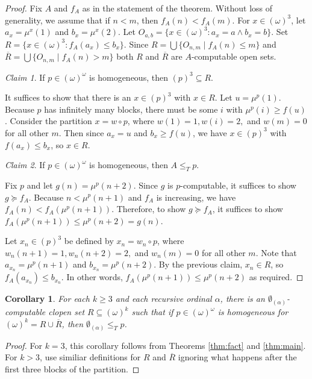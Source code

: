 \documentclass{amsart}
\newtheorem{cor}[thm]{Corollary}
\theoremstyle{definition}
\theoremstyle{remark}
\newtheorem*{claim}{Claim}
\begin{document}
\begin{proof}
Fix $A$ and $f_A$ as in the statement of the theorem. Without loss of generality, we assume that if $n < m$, then $f_A(n) < f_A(m)$. 
For $x \in (\omega)^3$, let $a_x = \mu^x(1)$ and $b_x = \mu^x(2)$. 
Let $O_{a,b} =  
\{ x \in (\omega)^3 : a_x = a \wedge b_x = b \}$. Set   
$R = \{ x \in (\omega)^3 : f_A(a_x) \leq b_x \}$. Since  $R = \bigcup \{ O_{n,m} \mid f_A(n) \leq m \}$ and $\overline{R} = \bigcup \{ O_{n,m} \mid f_A(n) > m \}$
both $R$ and $\overline{R}$ are $A$-computable open sets. 

\begin{claim}
If $p \in (\omega)^{\omega}$ is homogeneous, then $(p)^3 \subseteq R$. 
\end{claim}

It suffices to show that there is an $x \in (p)^3$ with $x \in R$.  Let $u = \mu^p(1)$. 
Because $p$ has infinitely many blocks, there must be some $i$ with $\mu^p(i) \geq f(u)$. Consider the partition $x = w \circ p$, where $w(1) = 1, w(i) =2,$ and $w(m) = 0$ for all other $m$.  Then since $a_x =
u$ and $b_x \geq f(u)$, we have $x \in (p)^3$ with $f(a_x) \leq b_x$, so $x \in R$.

\begin{claim}
If $p \in (\omega)^{\omega}$ is homogeneous, then $A \leq_T p$.
\end{claim}

Fix $p$ and let $g(n) = \mu^p(n+2)$. Since $g$ is $p$-computable, it suffices to show $g \succeq f_A$. Because  
$n < \mu^p(n+1)$ and $f_A$ is increasing, we have $f_A(n) < f_A(\mu^p(n+1))$. Therefore, to show $g \succeq f_A$, it suffices 
to show $f_A(\mu^p(n+1)) \leq \mu^p(n+2) = g(n)$. 

Let $x_n \in (p)^3$ be defined by $x_n = w_n\circ p$, where
$w_n(n+1) = 1, w_n(n+2) = 2,$ and $w_n(m) = 0$ for all other $m$.
Note that $a_{x_n} = \mu^p(n+1)$ and $b_{x_n} =
\mu^p(n+2)$.  By the previous claim, $x_n \in R$, so
$f_A(a_{x_n}) \leq b_{x_n}$. In other words, $f_A(\mu^p(n+1)) \leq \mu^p(n+2)$ as required.
\end{proof}

\begin{cor}
For each $k\geq 3$ and each recursive ordinal
$\alpha$, there is an $\emptyset_{(\alpha)}$-computable clopen
set $R\subseteq (\omega)^k$ such that if $p \in
(\omega)^{\omega}$ is homogeneous for $(\omega)^k = R \cup \overline{R}$, 
then $\emptyset_{(\alpha)} \leq_T p$.
\end{cor}
\begin{proof} 
For $k=3$, this corollary follows from Theorems \ref{thm:fact} and \ref{thm:main}. For $k > 3$, use similiar definitions for 
$R$ and $\overline{R}$ ignoring what happens after the first three blocks of the partition. 
\end{proof}
\end{document}
